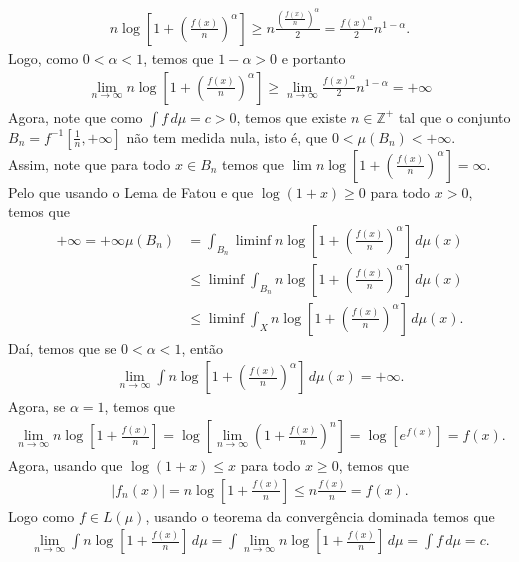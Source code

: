 \begin{homeworkProblem}[7]
\begin{solution}
    \begin{align*}
      n\log\left[ 1+\left( \frac{f(x)}{n} \right)^{\alpha} \right]\geq n \frac{\left(\frac{f(x)}{n}\right)^{\alpha}}{2}=\frac{f(x)^{\alpha}}{2}n^{1-\alpha}. 
    \end{align*}
    Logo, como $0<\alpha<1$, temos que $1-\alpha>0$ e portanto 
    \begin{align*}
      \lim_{n \to \infty}n\log\left[ 1+\left( \frac{f(x)}{n} \right)^{\alpha} \right]\geq \lim_{n \to \infty}\frac{f(x)^{\alpha}}{2}n^{1-\alpha}=+\infty
    \end{align*}
    Agora, note que como $\int f\,d\mu=c>0$, temos que existe $n\in\mathbb{Z}^{+}$ tal que o conjunto $B_n=f^{-1}\left[ \frac{1}{n},+\infty \right]$ não tem medida nula, isto é, que $0<\mu(B_n)<+\infty$.\\
    Assim, note que para todo $x\in B_n$ temos que $\lim n\log\left[ 1+\left( \frac{f(x)}{n} \right)^{\alpha} \right]=\infty$. Pelo que usando o Lema de Fatou e que $\log(1+x)\geq 0$ para todo $x>0$, temos que
    \begin{align*}
      +\infty=+\infty\mu(B_n)&=\int_{B_n}\liminf n\log\left[ 1+\left( \frac{f(x)}{n} \right)^{\alpha} \right]\,d\mu(x)\\
      &\leq \liminf \int_{B_n}n\log\left[ 1+\left( \frac{f(x)}{n} \right)^{\alpha} \right]\,d\mu(x)\\
      &\leq \liminf \int_{X}n\log\left[ 1+\left( \frac{f(x)}{n} \right)^{\alpha} \right]\,d\mu(x).
    \end{align*}
    Daí, temos que se $0<\alpha<1$, então
    \begin{align*}
      \lim_{n \to \infty}\int n\log\left[ 1+\left( \frac{f(x)}{n} \right)^{\alpha} \right]\,d\mu(x)=+\infty.
    \end{align*}
    Agora, se $\alpha=1$, temos que
    \begin{align*}
      \lim_{n \to \infty}n\log\left[ 1+ \frac{f(x)}{n}\right]=\log\left[ \lim_{n \to \infty}\left( 1+ \frac{f(x)}{n}\right)^{n} \right]=\log\left[ e^{f(x)} \right]=f(x).
    \end{align*}
    Agora, usando que $\log(1+x)\leq x$ para todo $x\geq 0$, temos que
    \begin{align*}
      |f_n(x)|=n\log\left[ 1+ \frac{f(x)}{n} \right]\leq n\frac{f(x)}{n}=f(x).
    \end{align*}
    Logo como $f\in L(\mu)$, usando o teorema da convergência dominada temos  que
    \begin{align*}
      \lim_{n \to \infty}\int n\log\left[ 1+\frac{f(x)}{n} \right]\,d\mu=\int \lim_{n \to \infty}n\log\left[ 1+\frac{f(x)}{n} \right]\,d\mu=\int f\,d\mu=c.

\end{align*}
\end{solution}
\end{homeworkProblem}
